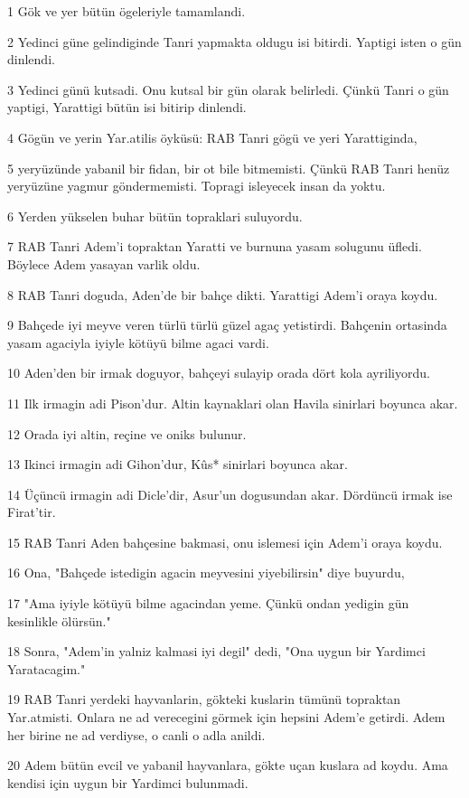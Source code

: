 \par 1 Gök ve yer bütün ögeleriyle tamamlandi.
\par 2 Yedinci güne gelindiginde Tanri yapmakta oldugu isi bitirdi. Yaptigi isten o gün dinlendi.
\par 3 Yedinci günü kutsadi. Onu kutsal bir gün olarak belirledi. Çünkü Tanri o gün yaptigi, Yarattigi bütün isi bitirip dinlendi.
\par 4 Gögün ve yerin Yar.atilis öyküsü: RAB Tanri gögü ve yeri Yarattiginda,
\par 5 yeryüzünde yabanil bir fidan, bir ot bile bitmemisti. Çünkü RAB Tanri henüz yeryüzüne yagmur göndermemisti. Topragi isleyecek insan da yoktu.
\par 6 Yerden yükselen buhar bütün topraklari suluyordu.
\par 7 RAB Tanri Adem'i topraktan Yaratti ve burnuna yasam solugunu üfledi. Böylece Adem yasayan varlik oldu.
\par 8 RAB Tanri doguda, Aden'de bir bahçe dikti. Yarattigi Adem'i oraya koydu.
\par 9 Bahçede iyi meyve veren türlü türlü güzel agaç yetistirdi. Bahçenin ortasinda yasam agaciyla iyiyle kötüyü bilme agaci vardi.
\par 10 Aden'den bir irmak doguyor, bahçeyi sulayip orada dört kola ayriliyordu.
\par 11 Ilk irmagin adi Pison'dur. Altin kaynaklari olan Havila sinirlari boyunca akar.
\par 12 Orada iyi altin, reçine ve oniks bulunur.
\par 13 Ikinci irmagin adi Gihon'dur, Kûs* sinirlari boyunca akar.
\par 14 Üçüncü irmagin adi Dicle'dir, Asur'un dogusundan akar. Dördüncü irmak ise Firat'tir.
\par 15 RAB Tanri Aden bahçesine bakmasi, onu islemesi için Adem'i oraya koydu.
\par 16 Ona, "Bahçede istedigin agacin meyvesini yiyebilirsin" diye buyurdu,
\par 17 "Ama iyiyle kötüyü bilme agacindan yeme. Çünkü ondan yedigin gün kesinlikle ölürsün."
\par 18 Sonra, "Adem'in yalniz kalmasi iyi degil" dedi, "Ona uygun bir Yardimci Yaratacagim."
\par 19 RAB Tanri yerdeki hayvanlarin, gökteki kuslarin tümünü topraktan Yar.atmisti. Onlara ne ad verecegini görmek için hepsini Adem'e getirdi. Adem her birine ne ad verdiyse, o canli o adla anildi.
\par 20 Adem bütün evcil ve yabanil hayvanlara, gökte uçan kuslara ad koydu. Ama kendisi için uygun bir Yardimci bulunmadi.
